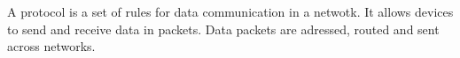 A protocol is a set of rules for data communication in a netwotk. It allows devices to send and receive data in packets. Data packets are adressed, routed and sent across networks.
